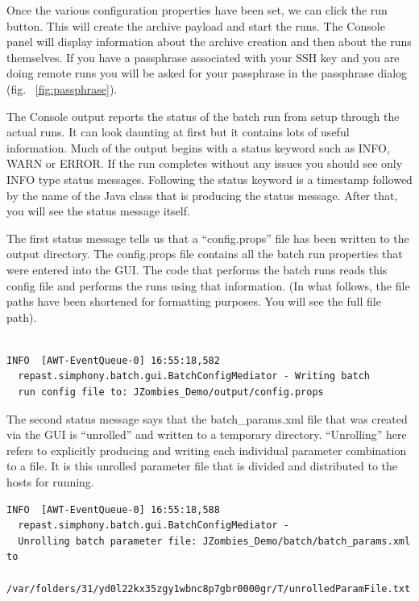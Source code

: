 \documentclass[11pt]{amsart}
\begin{document}
Once the various configuration properties have been set, we can click the run button. This will create the archive payload and start the runs. The Console panel will display information about the archive creation and then about the runs themselves. If you have a passphrase associated with your SSH key and you are doing remote runs you will be asked for  your passphrase in the passphrase dialog (fig. ~\ref{fig:passphrase}).

The Console output reports the status of the batch run from setup through the actual runs. It can look daunting at first but it contains lots of useful information. Much of the output begins with a status keyword such as INFO, WARN or ERROR. If the run completes without any issues you should see only INFO type status messages. Following the status keyword is a timestamp followed by the name of the Java class that is producing the status message. After that, you will see the status message itself.

The first status message tells us that a ``config.props'' file has been written to the output directory. The config.props file
contains all the batch run properties that were entered into the GUI. The code that performs the batch runs reads this config file and performs the runs using that information. (In what follows, the file paths have been shortened for formatting purposes.  You will see the full file path).

\begin{verbatim}

INFO  [AWT-EventQueue-0] 16:55:18,582
  repast.simphony.batch.gui.BatchConfigMediator - Writing batch
  run config file to: JZombies_Demo/output/config.props
\end{verbatim}

The second status message says that the batch\_params.xml file that was created via the GUI is ``unrolled'' and written to a temporary directory. ``Unrolling'' here refers to explicitly producing and writing each individual parameter combination to a file. It is this unrolled parameter file that is divided and distributed to the hosts for running.

\begin{verbatim}
INFO  [AWT-EventQueue-0] 16:55:18,588
  repast.simphony.batch.gui.BatchConfigMediator -
  Unrolling batch parameter file: JZombies_Demo/batch/batch_params.xml to
  /var/folders/31/yd0l22kx35zgy1wbnc8p7gbr0000gr/T/unrolledParamFile.txt
\end{verbatim}
\end{document}
